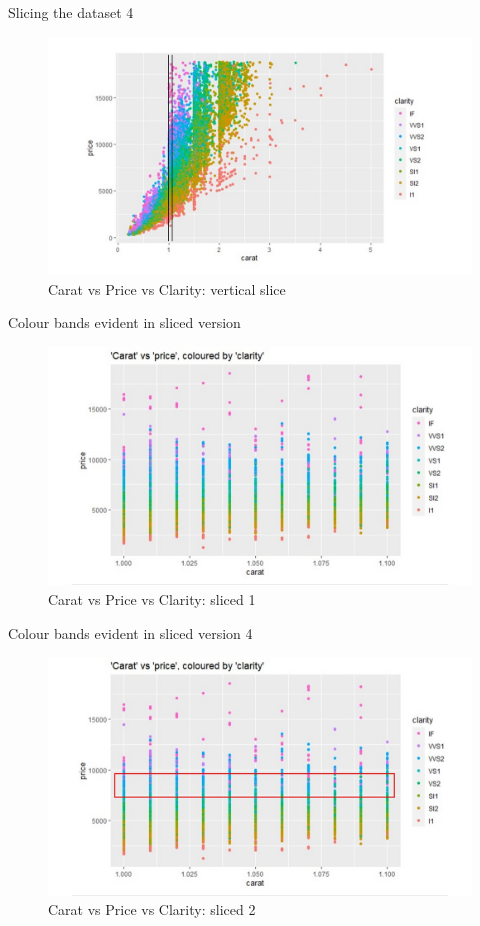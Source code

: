 \documentclass[
  ignorenonframetext,
]{beamer}
\begin{document}
\begin{frame}{Slicing the dataset 4}
\protect\hypertarget{slicing-the-dataset-4}{}
\begin{figure}
\centering
\includegraphics{./scatterplot vertical slice.jpg}
\caption{Carat vs Price vs Clarity: vertical slice}
\end{figure}
\end{frame}

\begin{frame}{Colour bands evident in sliced version}
\protect\hypertarget{colour-bands-evident-in-sliced-version}{}
\begin{figure}
\centering
\includegraphics{./carat vs price vs clarity 2.jpg}
\caption{Carat vs Price vs Clarity: sliced 1}
\end{figure}
\end{frame}

\begin{frame}{Colour bands evident in sliced version 4}
\protect\hypertarget{colour-bands-evident-in-sliced-version-4}{}
\begin{figure}
\centering
\includegraphics{./carat vs price vs clarity sliced.jpg}
\caption{Carat vs Price vs Clarity: sliced 2}
\end{figure}
\end{frame}
\end{document}
